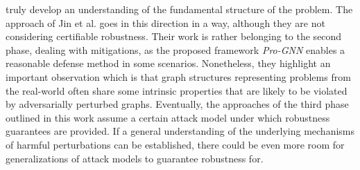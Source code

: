 \documentclass[a4paper,preprint]{sig-alternate}
\begin{document}
truly develop an understanding of the fundamental structure of the problem.
The approach of Jin et al. \cite{Jin_2020_Graph} goes in this direction in a way, although they are not considering certifiable robustness.
Their work is rather belonging to the second phase, dealing with mitigations, as the proposed framework
\textit{Pro-GNN} enables a reasonable defense method in some scenarios.
Nonetheless, they highlight an important observation which is that graph structures representing problems from the real-world often
share some intrinsic properties that are likely to be violated by adversarially perturbed graphs.
Eventually, the approaches of the third phase outlined in this work assume a certain attack model under which robustness guarantees are provided.
If a general understanding of the underlying mechanisms of harmful perturbations can be established, there could be even more room
for generalizations of attack models to guarantee robustness for.

\vfill
\pagebreak



\end{document}
